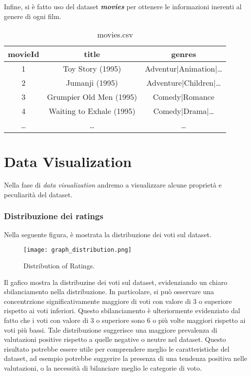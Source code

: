 \documentclass[../../Report.tex]{subfiles}
\begin{document}
Infine, si è fatto uso del dataset \textit{\textbf{movies}} per ottenere le informazioni inerenti al genere di ogni film.
\begin{table}[H]
    \centering
    \begin{tabular}{|c|c|c|}
        \hline
        \textbf{movieId} & \textbf{title}           & \textbf{genres}              \\
        \hline
        1                & Toy Story (1995)         & Adventur$|$Animation$|$\dots \\
        2                & Jumanji (1995)           & Adventure$|$Children$|$\dots \\
        3                & Grumpier Old Men (1995)  & Comedy$|$Romance             \\
        4                & Waiting to Exhale (1995) & Comedy$|$Drama$|$\dots       \\
        \dots            & \dots                    & \dots                        \\
        \hline
    \end{tabular}
    \caption{movies.csv}
    \label{tab:movies.csv}
\end{table}


\section{Data Visualization}
Nella fase di \textit{data visualization} andremo a visualizzare alcune proprietà e peculiarità del dataset.

\subsubsection{Distribuzione dei ratings}
Nella seguente figura, è mostrata la distribuzione dei voti sul dataset.
\begin{figure}[H]
    \centering
    \texttt{[image: graph\_distribution.png]}
    \caption{Distribution of Ratings.}
    \label{fig:ratings_distribution_graph}
\end{figure}
Il gafico mostra la distribuzine dei voti sul dataset, evidenziando un chiaro sbilanciamento nella distribuzione. In particolare, si può osservare una concentrzione significativamente maggiore di voti con valore di 3 o superiore rispetto ai voti inferiori.
Questo sbilanciamento è ulteriormente evidenziato dal fatto che i voti con valore di 3 o superiore sono 6 o più volte maggiori rispetto ai voti più bassi.
Tale distribuzione suggerisce una maggiore prevalenza di valutazioni positive rispetto a quelle negative o neutre nel dataset.
Questo risultato potrebbe essere utile per comprendere meglio le caratteristiche del dataset, ad esempio potrebbe suggerire la presenza di una tendenza positiva nelle valutazioni, o la necessità di bilanciare meglio le categorie di voto.
\end{document}
